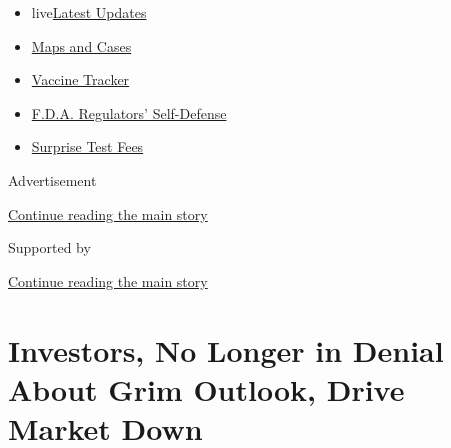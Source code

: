 \begin{itemize}
\tightlist
\item
  live\href{https://www.nytimes3xbfgragh.onion/2020/09/12/world/covid-19-coronavirus.html?name=styln-coronavirus-markets\&region=TOP_BANNER\&block=storyline_menu_recirc\&action=click\&pgtype=Article\&impression_id=b04528b1-f52c-11ea-aab9-5d05d5926c06\&variant=undefined}{Latest
  Updates}
\item
  \href{https://www.nytimes3xbfgragh.onion/interactive/2020/us/coronavirus-us-cases.html?name=styln-coronavirus-markets\&region=TOP_BANNER\&block=storyline_menu_recirc\&action=click\&pgtype=Article\&impression_id=b04528b2-f52c-11ea-aab9-5d05d5926c06\&variant=undefined}{Maps
  and Cases}
\item
  \href{https://www.nytimes3xbfgragh.onion/interactive/2020/science/coronavirus-vaccine-tracker.html?name=styln-coronavirus-markets\&region=TOP_BANNER\&block=storyline_menu_recirc\&action=click\&pgtype=Article\&impression_id=b04528b3-f52c-11ea-aab9-5d05d5926c06\&variant=undefined}{Vaccine
  Tracker}
\item
  \href{https://www.nytimes3xbfgragh.onion/2020/09/10/us/politics/fda-coronavirus-vaccine.html?name=styln-coronavirus-markets\&region=TOP_BANNER\&block=storyline_menu_recirc\&action=click\&pgtype=Article\&impression_id=b04528b4-f52c-11ea-aab9-5d05d5926c06\&variant=undefined}{F.D.A.
  Regulators' Self-Defense}
\item
  \href{https://www.nytimes3xbfgragh.onion/2020/09/09/upshot/coronavirus-surprise-test-fees.html?name=styln-coronavirus-markets\&region=TOP_BANNER\&block=storyline_menu_recirc\&action=click\&pgtype=Article\&impression_id=b04528b5-f52c-11ea-aab9-5d05d5926c06\&variant=undefined}{Surprise
  Test Fees}
\end{itemize}

Advertisement

\protect\hyperlink{after-top}{Continue reading the main story}

Supported by

\protect\hyperlink{after-sponsor}{Continue reading the main story}

\hypertarget{investors-no-longer-in-denial-about-grim-outlook-drive-market-down}{%
\section{Investors, No Longer in Denial About Grim Outlook, Drive Market
Down}\label{investors-no-longer-in-denial-about-grim-outlook-drive-market-down}}

